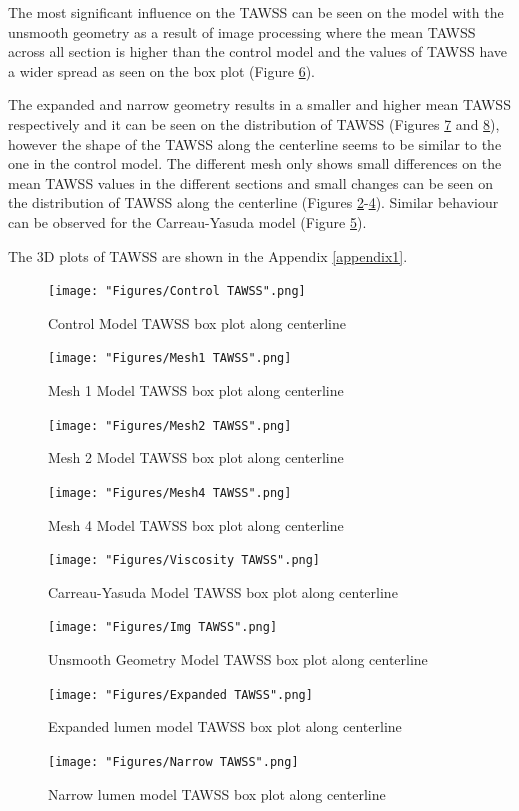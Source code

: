 The most significant influence on the TAWSS can be seen on the model with the unsmooth geometry as a result of image processing where the mean TAWSS across all section is higher than the control model and the values of TAWSS have a wider spread as seen on the box plot (Figure \ref{fig:TAWSSImg}). \par

The expanded and narrow geometry results in a smaller and higher mean TAWSS respectively and it can be seen on the distribution of TAWSS (Figures \ref{fig:TAWSSGeo1} and \ref{fig:TAWSSGeo2}), however the shape of the TAWSS along the centerline seems to be similar to the one in the control model. The different mesh only shows small differences on the mean TAWSS values in the different sections and small changes can be seen on the distribution of TAWSS along the centerline (Figures \ref{fig:TAWSSMesh1}-\ref{fig:TAWSSMesh4}). Similar behaviour can be observed for the Carreau-Yasuda model (Figure \ref{fig:TAWSSVis}). \par

The 3D plots of TAWSS are shown in the Appendix \ref{appendix1}.

\begin{figure}[ht!]
    \centering
    \texttt{[image: "Figures/Control TAWSS".png]}
    \caption{Control Model TAWSS box plot along centerline}
    \label{fig:TAWSScontrol}
\end{figure}
\begin{figure}[ht!]
    \centering
    \texttt{[image: "Figures/Mesh1 TAWSS".png]}
    \caption{Mesh 1 Model TAWSS box plot along centerline}
    \label{fig:TAWSSMesh1}
\end{figure}
\begin{figure}[ht!]
    \centering
    \texttt{[image: "Figures/Mesh2 TAWSS".png]}
    \caption{Mesh 2 Model TAWSS box plot along centerline}
    \label{fig:TAWSSMesh2}
\end{figure}
\begin{figure}[ht!]
    \centering
    \texttt{[image: "Figures/Mesh4 TAWSS".png]}
    \caption{Mesh 4 Model TAWSS box plot along centerline}
    \label{fig:TAWSSMesh4}
\end{figure}
\begin{figure}[ht!]
    \centering
    \texttt{[image: "Figures/Viscosity TAWSS".png]}
    \caption{Carreau-Yasuda Model TAWSS box plot along centerline}
    \label{fig:TAWSSVis}
\end{figure}
\begin{figure}[ht!]
    \centering
    \texttt{[image: "Figures/Img TAWSS".png]}
    \caption{Unsmooth Geometry Model TAWSS box plot along centerline}
    \label{fig:TAWSSImg}
\end{figure}
\begin{figure}[ht!]
    \centering
    \texttt{[image: "Figures/Expanded TAWSS".png]}
    \caption{Expanded lumen model TAWSS box plot along centerline}
    \label{fig:TAWSSGeo1}
\end{figure}
\begin{figure}[ht!]
    \centering
    \texttt{[image: "Figures/Narrow TAWSS".png]}
    \caption{Narrow lumen model TAWSS box plot along centerline}
    \label{fig:TAWSSGeo2}
\end{figure}

